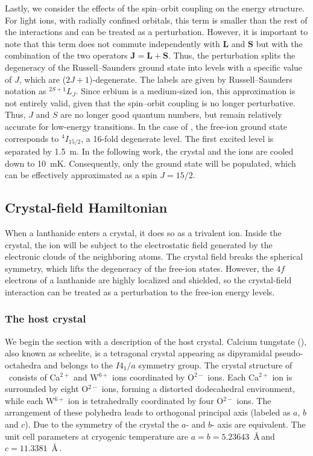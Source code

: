 Lastly, we consider the effects of the spin--orbit coupling on the energy structure. For light ions, with radially confined orbitals, this term is smaller than the rest of the interactions and can be treated as a perturbation. However, it is important to note that this term does not commute independently with $\mathbf{L}$ and $\mathbf{S}$ but with the combination of the two operators $\mathbf{J} = \mathbf{L} + \mathbf{S}$. Thus, the perturbation splits the degeneracy of the Russell--Saunders ground state into levels with a specific value of $J$, which are ($2J+1$)-degenerate. The labels are given by Russell--Saunders notation as $^{2S+1}L_J$. Since erbium is a medium-sized ion, this approximation is not entirely valid, given that the spin--orbit coupling is no longer perturbative. Thus, $J$ and $S$ are no longer good quantum numbers, but remain relatively accurate for low-energy transitions. In the case of \Er, the free-ion ground state corresponds to $^4I_{15/2}$, a 16-fold degenerate level. The first excited level is separated by 1.5~\textmu m. In the following work, the \Ca crystal and the ions are cooled down to 10~mK. Consequently, only the ground state will be populated, which can be effectively approximated as a spin $J=15/2$.

\subsection{Crystal-field Hamiltonian}
When a lanthanide enters a crystal, it does so as a trivalent ion. Inside the crystal, the ion will be subject to the electrostatic field generated by the electronic clouds of the neighboring atoms. The crystal field breaks the spherical symmetry, which lifts the degeneracy of the free-ion states. However, the $4f$ electrons of a lanthanide are highly localized and shielded, so the crystal-field interaction can be treated as a perturbation to the free-ion energy levels. 

\subsubsection{The host crystal}
We begin the section with a description of the host crystal. Calcium tungstate (\Ca), also known as scheelite, is a tetragonal crystal appearing as dipyramidal pseudo-octahedra and belongs to the $I4_1/a$ symmetry group. The crystal structure of \Ca\ consists of Ca$^{2+}$ and W$^{6+}$ ions coordinated by O$^{2-}$ ions. Each Ca$^{2+}$ ion is surrounded by eight O$^{2-}$ ions, forming a distorted dodecahedral environment, while each W$^{6+}$ ion is tetrahedrally coordinated by four O$^{2-}$ ions. The arrangement of these polyhedra leads to orthogonal principal axis (labeled as $a$, $b$ and $c$). Due to the symmetry of the crystal the $a$- and $b$- axis are equivalent. The unit cell parameters at cryogenic temperature are $a=b=5.23643$~\AA\,and $c=11.3381$~\AA\,\cite{senyshyn_lattice_2004}. 

